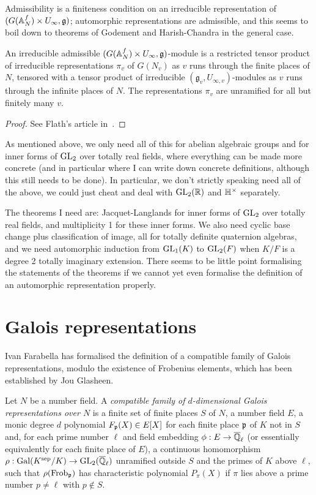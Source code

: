 Admissibility is a finiteness condition on an irreducible representation of $(G(\mathbb{A}_N^f)\times U_\infty,\mathfrak{g})$; automorphic representations are admissible, and this seems to boil down to theorems of Godement and Harish-Chandra in the general case. 


\begin{theorem} An irreducible admissible $(G(\mathbb{A}_N^f)\times U_\infty,\mathfrak{g})$-module is a restricted tensor product of irreducible representations $\pi_v$ of $G(N_v)$ as $v$ runs through the finite places of $N$, tensored with a tensor product of irreducible $(\mathfrak{g}_v,U_{\infty,v})$-modules as $v$ runs through the infinite places of $N$. The representations $\pi_v$ are unramified for all but finitely many $v$.
\end{theorem}
\begin{proof} See Flath's article in~\cite{corvallis2}.
\end{proof}

As mentioned above, we only need all of this for abelian algebraic groups and for inner forms of $\operatorname{GL}_2$ over totally real fields, where everything can be made more concrete (and in particular where I can write down concrete definitions, although this still needs to be done). In particular, we don't strictly speaking need all of the above, we could just cheat and deal with $\operatorname{GL}_2(\mathbb{R})$ and $\mathbb{H}^\times$ separately.

The theorems I need are: Jacquet-Langlands for inner forms of $\operatorname{GL}_2$ over totally real fields, 
and multiplicity 1 for these inner forms. We also need cyclic base change plus classification of image, all for totally definite quaternion algebras, and we need
automorphic induction from $\operatorname{GL}_1(K)$ to $\operatorname{GL}_2(F)$ when $K/F$ is a degree 2 totally imaginary extension. There seems to be little point formalising the statements of the theorems if we cannot yet even formalise the definition of an automorphic representation properly.

\section{Galois representations}

Ivan Farabella has formalised the definition of a compatible family of Galois
representations, modulo the existence of Frobenius elements, which has been
established by Jou Glasheen. 

\begin{definition}\leanok Let $N$ be a number field. A \emph{compatible family of $d$-dimensional Galois representations over $N$} is a finite set of finite places $S$ of $N$,
a number field $E$, a monic degree $d$ polynomial $F_{{\mathfrak{p}}}(X)\in E[X]$ for each finite place ${\mathfrak{p}}$ of $K$ not in $S$ and, for each prime number $\ell$ and field embedding $\phi : E\to\overline{\mathbb{Q}}_\ell$ (or essentially equivalently for each finite place of $E$), a continuous homomorphism $\rho:\operatorname{Gal}(K^{\operatorname{sep}}/K)\to\operatorname{GL}_2(\overline{\mathbb{Q}}_\ell)$ unramified outside $S$ and the primes of $K$ above $\ell$, such that $\rho(\operatorname{Frob}_{\mathfrak{p}})$ has characteristic polynomial $P_\pi(X)$ if $\pi$ lies above a prime number $p\not=\ell$ with $p\not\in S$.
\end{definition}

